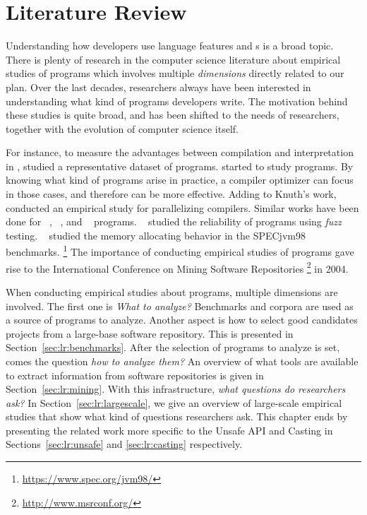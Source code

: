 \chapter{Literature Review}\label{cha:literature-review}

Understanding how developers use language features
and \api{}s is a broad topic.
There is plenty of research in the computer science literature about
empirical studies of programs which involves multiple \emph{dimensions}
directly related to our plan.
Over the last decades,
researchers always have been interested in understanding what
kind of programs developers write.
The motivation behind these studies is quite broad,
and has been shifted to the needs of researchers,
together with the evolution of computer science itself.

For instance, to measure the advantages between compilation and interpretation in \basic{},
\cite{hammondBASICEvaluationProcessing1977} studied a representative dataset of programs.
\cite{knuthEmpiricalStudyFORTRAN1971} started to study \fortran{} programs.
By knowing what kind of programs arise in practice,
a compiler optimizer can focus in those cases,
and therefore can be more effective.
Adding to Knuth's work,%
~\cite{shenEmpiricalStudyFortran1990} conducted an empirical study for
parallelizing compilers.
Similar works have been done for
\cobol{}~\cite{salvadoriStaticProfileCOBOL1975,chevanceStaticProfileDynamic1978},
\pascal{}~\cite{cookContextualAnalysisPascal1982},
and \apl{}~\cite{saalPropertiesAPLPrograms1975,saalEmpiricalStudyAPL1977} programs.%
~\cite{millerEmpiricalStudyReliability1990,millerFuzzRevisitedReexamination1995,forresterEmpiricalStudyRobustness2000}
studied the reliability of programs using \emph{fuzz} testing.%
~\cite{dieckmannStudyAllocationBehavior1999} studied the memory allocating
behavior in the SPECjvm98 benchmarks.%
\footnote{\url{https://www.spec.org/jvm98/}}
The importance of conducting empirical studies of programs
gave rise to the
International Conference on Mining Software Repositories%
\footnote{\url{http://www.msrconf.org/}}
in 2004.

When conducting empirical studies about programs,
multiple dimensions are involved.
The first one
is 
\emph{What to analyze?}
Benchmarks and corpora are used as a source of programs to analyze.
Another aspect is how to select good candidates projects from a large-base software repository.
This is presented in Section~\ref{sec:lr:benchmarks}.
After the selection of programs to analyze is set,
comes the question \emph{how to analyze them?}
An overview of what tools are available to extract information from software repositories is given in Section~\ref{sec:lr:mining}.
With this infrastructure, \emph{what questions do researchers ask?}
In Section~\ref{sec:lr:largescale}, we give an overview of large-scale
empirical studies
that show what
kind of questions researchers ask.
This chapter ends by presenting the related work more specific to
the Unsafe API and Casting in
Sections~\ref{sec:lr:unsafe} and \ref{sec:lr:casting}
respectively.


